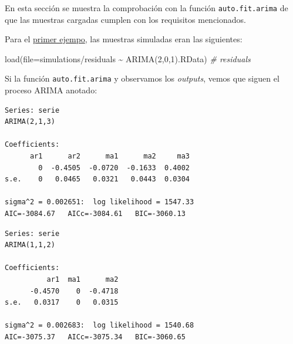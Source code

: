 \documentclass[
  12pt,
  a4paper]{article}
\newenvironment{Shaded}{\begin{snugshade}}{\end{snugshade}}
\newcommand{\AttributeTok}[1]{\textcolor[rgb]{0.77,0.63,0.00}{#1}}
\newcommand{\CommentTok}[1]{\textcolor[rgb]{0.56,0.35,0.01}{\textit{#1}}}
\newcommand{\FunctionTok}[1]{\textcolor[rgb]{0.00,0.00,0.00}{#1}}
\newcommand{\NormalTok}[1]{#1}
\newcommand{\SpecialCharTok}[1]{\textcolor[rgb]{0.00,0.00,0.00}{#1}}
\newcommand{\StringTok}[1]{\textcolor[rgb]{0.31,0.60,0.02}{#1}}
\begin{document}
En esta sección se muestra la comprobación con la función
\texttt{auto.fit.arima} de que las muestras cargadas cumplen con los
requisitos mencionados.

Para el \protect\hyperlink{ejemplo1}{primer ejempo}, las muestras
simuladas eran las siguientes:

\begin{Shaded}
\begin{Highlighting}[]
\FunctionTok{load}\NormalTok{(}\AttributeTok{file=}\StringTok{\textquotesingle{}simulations/residuals \textasciitilde{} ARIMA(2,0,1).RData\textquotesingle{}}\NormalTok{) }\CommentTok{\# residuals}
\end{Highlighting}
\end{Shaded}

Si la función \texttt{auto.fit.arima} y observamos los \emph{outputs},
vemos que siguen el proceso ARIMA anotado:

\begin{Shaded}
\end{Shaded}

\begin{verbatim}
Series: serie 
ARIMA(2,1,3) 

Coefficients:
      ar1      ar2      ma1      ma2     ma3
        0  -0.4505  -0.0720  -0.1633  0.4002
s.e.    0   0.0465   0.0321   0.0443  0.0304

sigma^2 = 0.002651:  log likelihood = 1547.33
AIC=-3084.67   AICc=-3084.61   BIC=-3060.13
\end{verbatim}

\begin{Shaded}
\end{Shaded}

\begin{verbatim}
Series: serie 
ARIMA(1,1,2) 

Coefficients:
          ar1  ma1      ma2
      -0.4570    0  -0.4718
s.e.   0.0317    0   0.0315

sigma^2 = 0.002683:  log likelihood = 1540.68
AIC=-3075.37   AICc=-3075.34   BIC=-3060.65
\end{verbatim}
\end{document}
